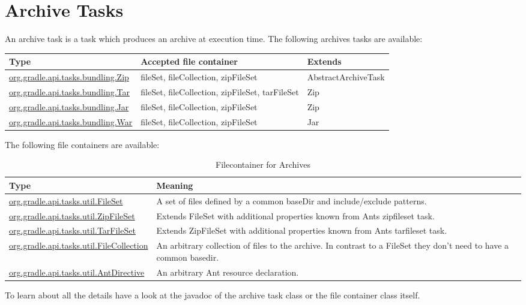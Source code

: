\section{Archive Tasks} %
\label{sec:archive_tasks}
An archive task is a task which produces an archive at execution time. The following archives tasks are available:
\begin{center}
	\begin{tabular}{|l|l|l|} \hline
		Type & Accepted file container & Extends \\ \hline
		\href{\API tasks/bundling/Zip.html}{org.gradle.api.tasks.bundling.Zip} & fileSet, fileCollection, zipFileSet & AbstractArchiveTask \\ \hline
		\href{\API tasks/bundling/Tar.html}{org.gradle.api.tasks.bundling.Tar} & fileSet, fileCollection, zipFileSet, tarFileSet & Zip \\ \hline
		\href{\API tasks/bundling/Jar.html}{org.gradle.api.tasks.bundling.Jar} & fileSet, fileCollection, zipFileSet & Zip \\ \hline
		\href{\API tasks/bundling/War.html}{org.gradle.api.tasks.bundling.War} & fileSet, fileCollection, zipFileSet & Jar \\ \hline		
	\end{tabular}
\end{center}
The following file containers are available:
\begin{table}
\begin{center}
\begin{tabularx}{\textwidth}{|l|X|} \hline
		Type & Meaning \\ \hline
		\href{\API tasks/util/FileSet.html}{org.gradle.api.tasks.util.FileSet} & A set of files defined by a common baseDir and include/exclude patterns. \\ \hline
		\href{\API tasks/util/ZipFileSet.html}{org.gradle.api.tasks.util.ZipFileSet} & Extends FileSet with additional properties known from Ants zipfileset task.\\ \hline
	    \href{\API tasks/util/TarFileSet.html}{org.gradle.api.tasks.util.TarFileSet} & Extends ZipFileSet with additional properties known from Ants tarfileset task.\\ \hline
		\href{\API tasks/util/FileCollection.html}{org.gradle.api.tasks.util.FileCollection} & An arbitrary collection of files to the archive. In contrast to a FileSet they don't need to have a common basedir.\\ \hline
	    \href{\API tasks/util/AntDirective.html}{org.gradle.api.tasks.util.AntDirective} & An arbitrary Ant resource declaration.\\ \hline	
\end{tabularx}
\end{center}
	\caption{Filecontainer for Archives}
	\label{filecontainer}
\end{table}
To learn about all the details have a look at the javadoc of the archive task class or the file container class itself.

